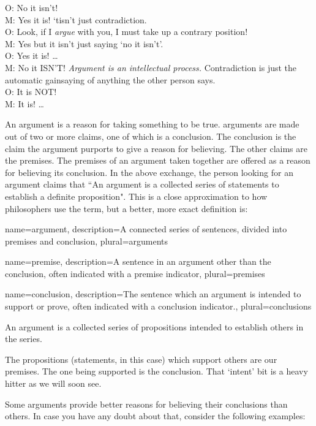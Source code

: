 {\begin{multicols}{2}
O: No it isn't!\\
M: Yes it is! ‘tisn't just contradiction.\\
O: Look, if I \emph{argue} with you, I must take up a contrary position!\\
M: Yes but it isn't just saying ‘no it isn't'.\\
O: Yes it is!
\ldots\\
M: No it ISN'T! \emph{Argument is an intellectual process.} Contradiction is just the automatic gainsaying of anything the other person says.\\
O: It is NOT!\\
M: It is!
\ldots 
\end{multicols}}

An argument is a reason for taking something to be true. \Glspl{argument} are made out of two or more claims, one of which is a \gls{conclusion}. The conclusion is the claim the argument purports to give a reason for believing. The other claims are the \glspl{premise}. The premises of an argument taken together are offered as a reason for believing its conclusion. In the above exchange, the person looking for an argument claims that ``An argument is a collected series of statements to establish a definite proposition". This is a close approximation to how philosophers use the term, but a better, more exact definition is:


{
name=argument,
description={A connected series of sentences, divided into \gls{premise}s and \gls{conclusion}},
plural=arguments
}

{
name=premise,
description={A sentence in an \gls{argument} other than the \gls{conclusion}, often indicated with a premise indicator},
plural=premises
}

{
name=conclusion,
description={The sentence which an argument is intended to support or prove, often indicated with a conclusion indicator.},
plural=conclusions
}

\begin{center}
An argument is a collected series of propositions intended to establish others in the series.
\end{center}
The propositions (statements, in this case) which support others are our premises. The one being supported is the conclusion. That `intent' bit is a heavy hitter as we will soon see.

Some arguments provide better reasons for believing their conclusions than others. In case you have any doubt about that, consider the following examples:


